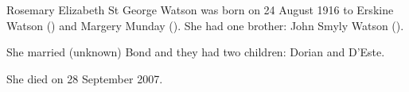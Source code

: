 
Rosemary Elizabeth St George Watson was born on	24 August 1916 	to Erskine Watson () and Margery Munday (). She had one brother:  John Smyly Watson ().

She married (unknown) Bond and they had two children: Dorian and D'Este.

She died on 28 September 2007.
